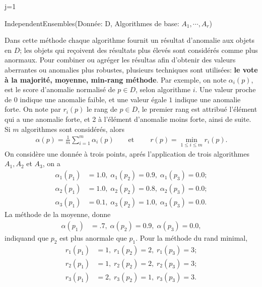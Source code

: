 \begin{algorithm}
\SetAlgoLined
j=1\;
\caption{IndependentEnsembles(Donnée: D,
	Algorithmes de base: $A_1,\cdots,A_r$)}
\end{algorithm}
Dans cette  méthode chaque algorithme fournit un résultat  d'anomalie
aux objets en $D$; les objets qui reçoivent des résultats plus élevés sont considérés comme plus anormaux. Pour combiner ou agréger les résultas afin d'obtenir des valeurs aberrantes ou anomalies plus robustes, plusieurs techniques sont utilisées: \textbf{le vote à la majorité, moyenne, min-rang méthode}. Par exemple, 
on note $\alpha_i(p)$, est le score d'anomalie normalisé de $p\in D$, selon
algorithme $i$. Une valeur proche de $0$  indique une anomalie faible, et une valeur égale $1$ indique une anomalie forte. On note par $r_i(p)$ le rang de $p\in D$, le premier rang est attribué l'élément qui a une anomalie forte,  et 2 à l'élément d'anomalie moins  forte, ainsi de suite. Si $m$ algorithmes sont considérés, alors
\begin{align}
\alpha(p)=\frac{1}{m}\sum_{i=1}^{m}\alpha_i(p) \qquad \text{et}\; \qquad r(p) =\min_{1\leq i \leq m} r_i(p).
\end{align}
 On considère une donnée à trois points, aprés l'application de trois
algorithmes $A_1, A_2$ et $A_3$, on a 
\begin{align*}
	\alpha_{1}\left(p_{1}\right)&=1.0,\; \alpha_{1}\left(p_{2}\right)=0.9,\; \alpha_{1}\left(p_{3}\right)=0.0; \\ 
\alpha_{2}\left(p_{1}\right)&=1.0,\; \alpha_{2}\left(p_{2}\right)=0.8,\; \alpha_{2}\left(p_{3}\right)=0.0;\\
\alpha_{3}\left(p_{1}\right)&=0.1,\;  \alpha_{3}\left(p_{2}\right)=1.0,\; \alpha_{3}\left(p_{3}\right)=0.0.
\end{align*}
La méthode de la moyenne, donne 
\begin{align*}
\alpha\left(p_{1}\right)&=.7,\; \alpha\left(p_{2}\right)=0.9,\; \alpha\left(p_{3}\right)=0.0,
\end{align*}
indiquand que $p_2$ est plus anormale que $p_1$. Pour la méthode du rand minimal,
\begin{align*}
r_{1}\left(p_{1}\right)&=1,\; r_{1}\left(p_{2}\right)=2,\; r_{1}\left(p_{3}\right)=3;\\ 
r_{2}\left(p_{1}\right)&=1,\; r_{2}\left(p_{2}\right)=2,\; r_{2}\left(p_{3}\right)=3;\\
r_{3}\left(p_{1}\right)&=2,\; r_{3}\left(p_{2}\right)=1,\; r_{3}\left(p_{3}\right)=3.
\end{align*}
